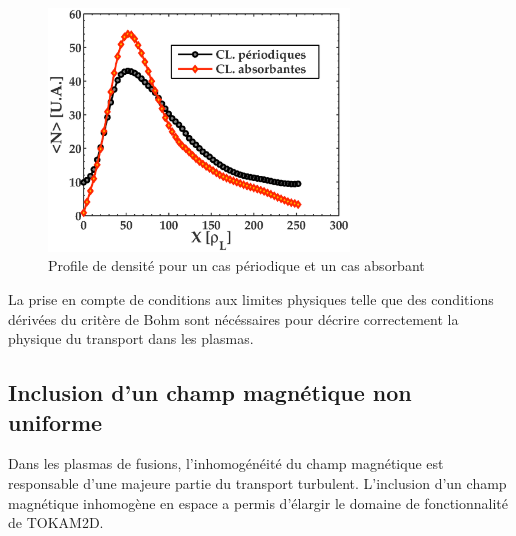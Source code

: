 \begin{refsection}
	\begin{figure}[htbp]
\centering
    \includegraphics[width=8cm]{figures/2-profileDenNoLimit.eps}
    \caption{Profile de densité pour un cas périodique et un cas
    absorbant\label{2-profileDenNoLimit}}
\end{figure}
\footnotemark{}
	
	La prise en compte de conditions aux limites physiques telle que des conditions dérivées du critère de Bohm 
	sont nécéssaires pour décrire correctement la physique du transport dans les plasmas. 
	
	\subsection{Inclusion d'un champ magnétique non uniforme}
	Dans les plasmas de fusions, l'inhomogénéité du champ magnétique est responsable d'une majeure partie du transport turbulent.
	L'inclusion d'un champ magnétique inhomogène en espace a permis d'élargir le domaine de fonctionnalité de TOKAM2D. 
	

\end{refsection}
